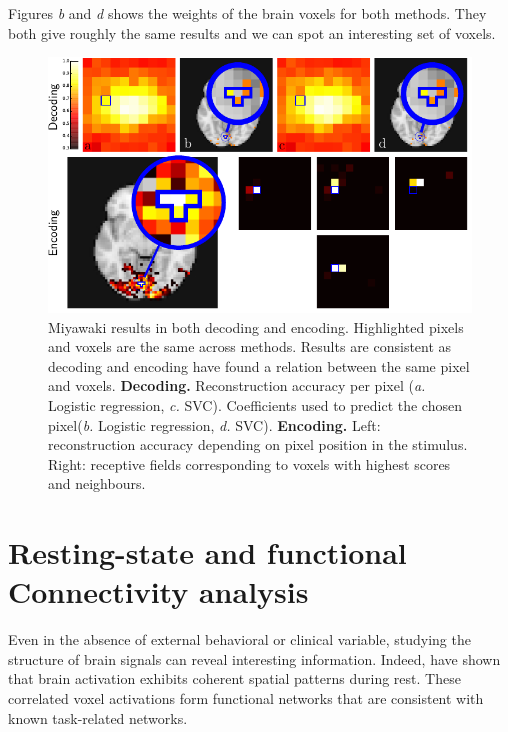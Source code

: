 \documentclass{frontiersSCNS} %
\begin{document}
Figures \textit{b} and \textit{d} shows the weights of the brain voxels for both
methods. They both give roughly the same results and we can spot an interesting
set of voxels.

\begin{figure}[hbtp]
  \begin{center}
    \includegraphics[width=\linewidth]{img/miyawaki/figure}
  \end{center}
  \caption{
      Miyawaki results in both decoding and encoding. Highlighted pixels and
      voxels are the same across methods. Results are consistent as decoding
      and encoding have found a relation between the same pixel and voxels.
      \textbf{Decoding.} Reconstruction accuracy per pixel (\textit{a.} Logistic
      regression, \textit{c.} SVC). Coefficients used to predict the chosen pixel(\textit{b.} Logistic
      regression, \textit{d.} SVC). 
      \textbf{Encoding.} Left: reconstruction accuracy depending on pixel
           position in the stimulus. Right: receptive fields corresponding to
       voxels with highest scores and neighbours.}
\label{fig:miyawaki}
\end{figure}


\section{Resting-state and functional Connectivity analysis}

Even in the absence of external behavioral or clinical variable, studying
the structure of brain signals can reveal interesting information.
Indeed, \cite{biswal1995} have shown that brain activation exhibits
coherent spatial patterns during rest. These correlated voxel activations
form functional networks that are consistent with known task-related networks.
\end{document}
